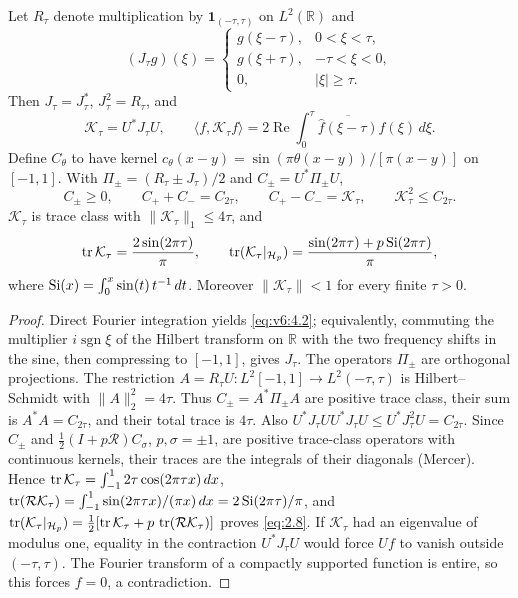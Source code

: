 \begin{proposition}\label{thm:crosswindow}\label{prop:traces}
Let $R_\tau$ denote multiplication by $\mathbf1_{(-\tau,\tau)}$ on
$L^2(\mathbb R)$ and
\begin{equation}\label{eq:v6:4.1}
 (J_\tau g)(\xi)=
 \begin{cases}g(\xi-\tau),&0<\xi<\tau,\\
 g(\xi+\tau),&-\tau<\xi<0,\\0,&|\xi|\ge\tau.
 \end{cases}
\end{equation}
Then $J_\tau=J_\tau^*$, $J_\tau^2=R_\tau$, and
\begin{equation}\label{eq:v6:4.2}
 \mathcal K_\tau=U^*J_\tau U,\qquad
 \langle f,\mathcal K_\tau f\rangle
 =2\operatorname{Re}\int_0^\tau
 \overline{\widehat f(\xi-\tau)}\widehat f(\xi)\,d\xi.
\end{equation}
Define $C_\theta$ to have kernel
$c_\theta(x-y)=\sin(\pi\theta(x-y))/[\pi(x-y)]$ on $[-1,1]$.
With $\Pi_\pm=(R_\tau\pm J_\tau)/2$ and $C_\pm=U^*\Pi_\pm U$,
\begin{equation}\label{eq:positive-split}
 C_\pm\ge0,\qquad C_++C_-=C_{2\tau},\qquad
 C_+-C_-=\mathcal K_\tau,\qquad \mathcal K_\tau^2\le C_{2\tau}.
\end{equation}
$\mathcal K_\tau$ is trace class with $\|\mathcal K_\tau\|_1\le4\tau$, and
\begin{equation}\label{eq:2.8}
 \operatorname{tr}\mathcal K_\tau=\frac{2\sin(2\pi\tau)}\pi,\qquad
 \operatorname{tr}(\mathcal K_\tau|_{\mathcal H_p})
 =\frac{\sin(2\pi\tau)+p\operatorname{Si}(2\pi\tau)}\pi,
\end{equation}
where $\operatorname{Si}(x)=\int_0^x\sin(t)\,t^{-1}\,dt$.
Moreover $\|\mathcal K_\tau\|<1$ for every finite $\tau>0$.
\end{proposition}
\begin{proof}
Direct Fourier integration yields \eqref{eq:v6:4.2}; equivalently, commuting
the multiplier $i\operatorname{sgn}\xi$ of the Hilbert transform on
$\mathbb R$ with the two frequency shifts in the sine, then compressing to
$[-1,1]$, gives $J_\tau$.
The operators $\Pi_\pm$ are orthogonal projections.  The restriction
$A=R_\tau U:L^2[-1,1]\to L^2(-\tau,\tau)$ is Hilbert--Schmidt with
$\|A\|_2^2=4\tau$.  Thus $C_\pm=A^*\Pi_\pm A$ are positive trace class,
their sum is $A^*A=C_{2\tau}$, and their total trace is $4\tau$.
Also $U^*J_\tau UU^*J_\tau U\le U^*J_\tau^2U=C_{2\tau}$.
Since $C_\pm$ and $\tfrac12(I+p\mathcal R)C_\sigma$, $p,\sigma=\pm1$, are
positive trace-class operators with continuous kernels, their traces are the integrals of their
diagonals (Mercer).  Hence
$\operatorname{tr}\mathcal K_\tau=\int_{-1}^1 2\tau\cos(2\pi\tau x)\,dx$,
$\operatorname{tr}(\mathcal R\mathcal K_\tau)=\int_{-1}^1\sin(2\pi\tau x)/(\pi x)\,dx
 =2\operatorname{Si}(2\pi\tau)/\pi$,
and $\operatorname{tr}(\mathcal K_\tau|_{\mathcal H_p})=\tfrac12[\operatorname{tr}\mathcal
K_\tau+p\,\operatorname{tr}(\mathcal R\mathcal K_\tau)]$ proves \eqref{eq:2.8}.
If $\mathcal K_\tau$ had an eigenvalue of modulus one, equality in the
contraction $U^*J_\tau U$ would force $Uf$ to vanish outside $(-\tau,\tau)$.
The Fourier transform of a compactly supported function is entire, so this
forces $f=0$, a contradiction.
\end{proof}

